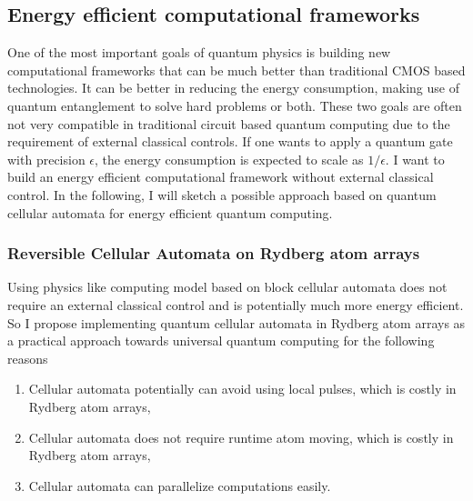 \documentclass[a4paper]{article}
\newcommand{\<}{\langle}
\renewcommand{\>}{\rangle}
\begin{document}
\subsection{Energy efficient computational frameworks}
One of the most important goals of quantum physics is building new computational frameworks that can be much better than traditional CMOS based technologies.
It can be better in reducing the energy consumption, making use of quantum entanglement to solve hard problems or both.
These two goals are often not very compatible in traditional circuit based quantum computing due to the requirement of external classical controls.
If one wants to apply a quantum gate with precision $\epsilon$, the energy consumption is expected to scale as $1/\epsilon$.
I want to build an energy efficient computational framework without external classical control.
In the following, I will sketch a possible approach based on quantum cellular automata for energy efficient quantum computing.

\subsubsection{Reversible Cellular Automata on Rydberg atom arrays}

Using physics like computing model based on block cellular automata does not require an external classical control and is potentially much more energy efficient.
So I propose implementing quantum cellular automata in Rydberg atom arrays as a practical approach towards universal quantum computing for the following reasons
\begin{enumerate}
    \item Cellular automata potentially can avoid using local pulses, which is costly in Rydberg atom arrays,
    \item Cellular automata does not require runtime atom moving, which is costly in Rydberg atom arrays,
    \item Cellular automata can parallelize computations easily.
\end{enumerate}
\end{document}
